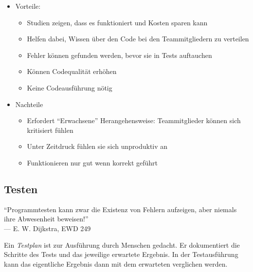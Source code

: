\documentclass[ngerman,color=3b]{tuda_summary}
\begin{document}
\begin{itemize}
    \item Vorteile: \begin{itemize}
              \item Studien zeigen, dass es funktioniert und Kosten sparen kann
              \item Helfen dabei, Wissen über den Code bei den Teammitgliedern zu verteilen
              \item Fehler können gefunden werden, bevor sie in Tests auftauchen
              \item Können Codequalität erhöhen
              \item Keine Codeausführung nötig
          \end{itemize}
    \item Nachteile\begin{itemize}
              \item Erfordert \enquote{Erwachsene} Herangehensweise: Teammitglieder können sich kritisiert fühlen
              \item Unter Zeitdruck fühlen sie sich unproduktiv an
              \item Funktionieren nur gut wenn korrekt geführt
          \end{itemize}
\end{itemize}
\clearpage
\subsection{Testen}
\begin{defBox}
    \enquote{Programmtesten kann zwar die Existenz von Fehlern aufzeigen, aber niemals ihre Abwesenheit beweisen!}\mbox{}\\\mbox{}\hfill — E. W. Dijkstra, EWD 249
\end{defBox}
\begin{definition}[Testplan]
    Ein \textit{Testplan} ist zur Ausführung durch Menschen gedacht. Er dokumentiert die Schritte des Tests und das jeweilige erwartete Ergebnis. In der Testausführung kann das eigentliche Ergebnis dann mit dem erwarteten verglichen werden.
\end{definition}
\end{document}
